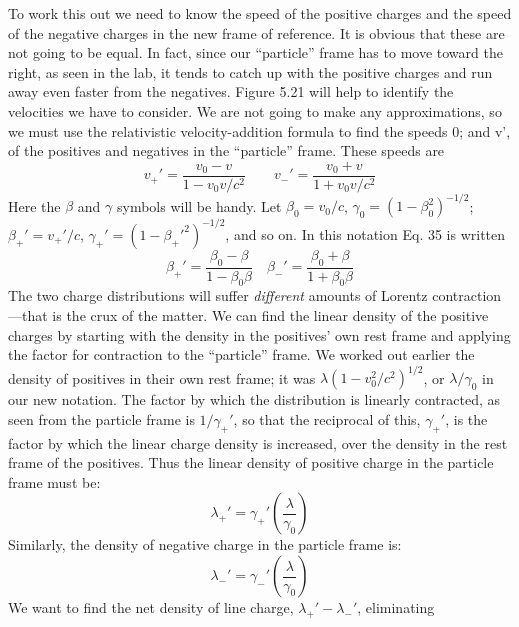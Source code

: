 
To work this out we need to know the speed of the positive charges
and the speed of the negative charges in the new frame of reference.
It is obvious that these are not going to be equal. In fact, since our
``particle'' frame has to move toward the right, as seen in the lab, it
tends to catch up with the positive charges and run away even faster
from the negatives. Figure 5.21 will help to identify the velocities we
have to consider. We are not going to make any approximations, so
we must use the relativistic velocity-addition formula to find the
speeds 0; and v', of the positives and negatives in the ``particle''
frame. These speeds are
\begin{equation}
  v_+' = \frac{v_0-v}{1-v_0v/c^2} \qquad
  v_-' = \frac{v_0+v}{1+v_0v/c^2} 
\end{equation}
Here the $\beta$ and $\gamma$ symbols will be handy. Let $\beta_0=v_0/c$, $\gamma_0=(1-\beta_0^2)^{-1/2}$;
$\beta_+'=v_+'/c$, $\gamma_+'=(1-\beta_+'^2)^{-1/2}$, and so on. In
this notation Eq. 35 is written
\begin{equation}
  \beta_+' = \frac{\beta_0-\beta}{1-\beta_0\beta} \quad
  \beta_-' = \frac{\beta_0+\beta}{1+\beta_0\beta} 
\end{equation}
The two charge distributions will suffer \emph{different} amounts of
Lorentz contraction---that is the crux of the matter. We can find the
linear density of the positive charges by starting with the density in
the positives' own rest frame and applying the factor for contraction
to the ``particle'' frame. We worked out earlier the density of positives
in their own rest frame; it was $\lambda(1-v_0^2/c^2)^{1/2}$, or $\lambda/\gamma_0$ in our
new notation. The factor by which the distribution is linearly 
contracted, as seen from the particle frame is $1/\gamma_+'$, so that the reciprocal
of this, $\gamma_+'$, is the factor by which the linear charge density is increased,
over the density in the rest frame of the positives. Thus the linear
density of positive charge in the particle frame must be:
\begin{equation}
  \lambda_+' = \gamma_+'\left(\frac{\lambda}{\gamma_0}\right)
\end{equation}
Similarly, the density of negative charge in the particle frame is:
\begin{equation}
  \lambda_-' = \gamma_-'\left(\frac{\lambda}{\gamma_0}\right)
\end{equation}
We want to find the net density of line charge, $\lambda_+'-\lambda_-'$, eliminating
